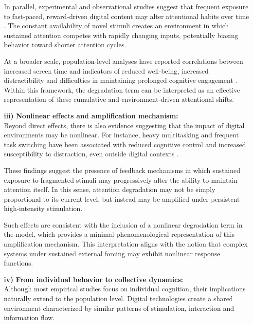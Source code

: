 \documentclass[preprint,12pt]{elsarticle}
\begin{document}
In parallel, experimental and observational studies suggest that frequent exposure to fast-paced, reward-driven digital content may alter attentional habits over time \cite{gazzaley}. The constant availability of novel stimuli creates an environment in which sustained attention competes with rapidly changing inputs, potentially biasing behavior toward shorter attention cycles.

At a broader scale, population-level analyses have reported correlations between increased screen time and indicators of reduced well-being, increased distractibility and difficulties in maintaining prolonged cognitive engagement \cite{Twenge}. Within this framework, the degradation term can be interpreted as an effective representation of these cumulative and environment-driven attentional shifts.


\vspace{0.5cm}

\noindent
\textbf{iii) Nonlinear effects and amplification mechanism:}
\\

Beyond direct effects, there is also evidence suggesting that the impact of digital environments may be nonlinear. For instance, heavy multitasking and frequent task switching have been associated with reduced cognitive control and increased susceptibility to distraction, even outside digital contexts \cite{gazzaley,ophir}.

These findings suggest the presence of feedback mechanisms in which sustained exposure to fragmented stimuli may progressively alter the ability to maintain attention itself. In this sense, attention degradation may not be simply proportional to its current level, but instead may be amplified under persistent high-intensity stimulation.

Such effects are consistent with the inclusion of a nonlinear degradation term in the model, which provides a minimal phenomenological representation of this amplification mechanism. This interpretation aligns with the notion that complex systems under sustained external forcing may exhibit nonlinear response functions.



\vspace{0.5cm}

\noindent
\textbf{iv) From individual behavior to collective dynamics:}
\\

Although most empirical studies focus on individual cognition, their implications naturally extend to the population level. Digital technologies create a shared environment characterized by similar patterns of stimulation, interaction and information flow.
\end{document}
